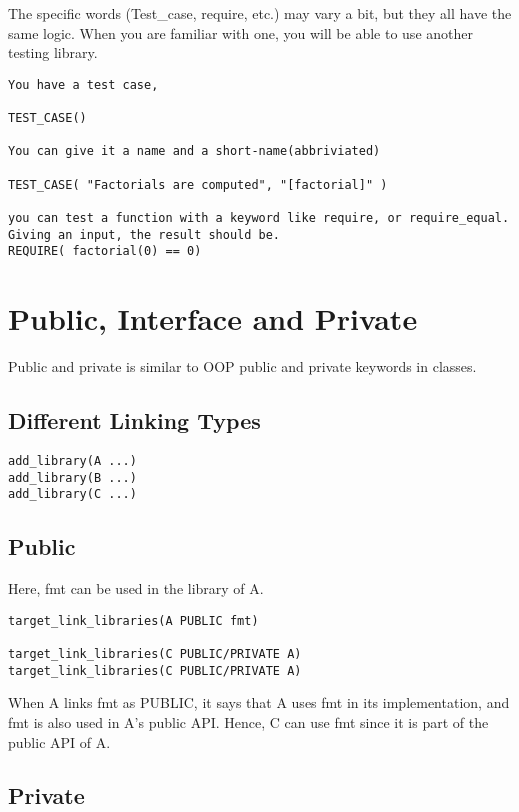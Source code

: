 The specific words (Test\_case, require, etc.) may vary a bit, but they all have the same logic. When you are familiar with one, 
you will be able to use another testing library.

\begin{verbatim}
You have a test case, 

TEST_CASE()

You can give it a name and a short-name(abbriviated)

TEST_CASE( "Factorials are computed", "[factorial]" )

you can test a function with a keyword like require, or require_equal. Giving an input, the result should be. 
REQUIRE( factorial(0) == 0)
\end{verbatim}

\section{Public, Interface and Private}

Public and private is similar to OOP public and private keywords in classes.

\subsection{Different Linking Types}

\begin{verbatim}
add_library(A ...)
add_library(B ...)
add_library(C ...)
\end{verbatim}

\subsection{Public}

Here, fmt can be used in the library of A. 

\begin{verbatim}
target_link_libraries(A PUBLIC fmt)

target_link_libraries(C PUBLIC/PRIVATE A)
target_link_libraries(C PUBLIC/PRIVATE A)
\end{verbatim}

When A links fmt as PUBLIC, it says that A uses fmt in its implementation, and fmt is also used in A's public API.
Hence, C can use fmt since it is part of the public API of A.

\subsection{Private}


